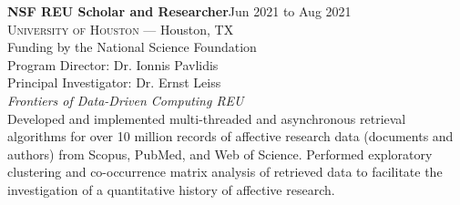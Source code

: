 \documentclass[hidelinks, 10pt]{article}
\def\contentwidth{0.9\linewidth}    %
\def\contentheaderspacing{1mm}      %
\begin{document}
{\begin{minipage}[ct]{\contentwidth}
    \textbf{NSF REU Scholar and Researcher}\hfill Jun 2021 to Aug 2021\\
    \textsc{University of Houston} --- Houston, TX\\
    Funding by the National Science Foundation\\
    Program Director: Dr. Ionnis Pavlidis\\
    Principal Investigator: Dr. Ernst Leiss
    \vspace{\contentheaderspacing}\\
    {\textit{Frontiers of Data-Driven Computing REU}}\\
    Developed and implemented multi-threaded and asynchronous retrieval algorithms for over 10 million records of affective research data
    (documents and authors) from Scopus, PubMed, and Web of Science. Performed exploratory clustering and co-occurrence matrix analysis of
    retrieved data to facilitate the investigation of a quantitative history of affective research.
\end{minipage}

\vspace{2mm}


}
\end{document}

